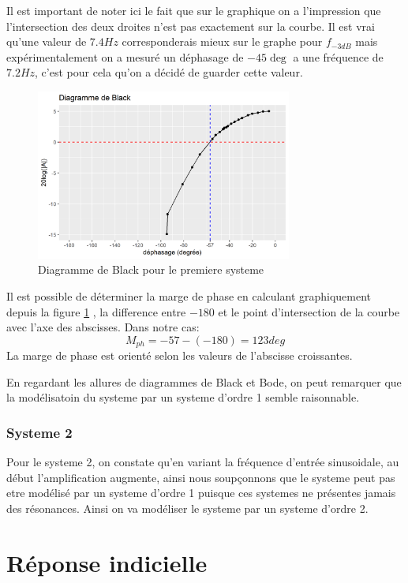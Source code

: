 \documentclass[12pt, a4paper]{report}
\begin{document}
Il est important de noter ici le fait que sur le graphique on a l'impression que
l'intersection des deux droites n'est pas exactement sur la courbe. Il est vrai 
qu'une valeur de $7.4 Hz$ corresponderais mieux sur le graphe pour $f_{-3dB}$ mais 
expérimentalement on a mesuré un déphasage de $-45 \deg$ a une fréquence de $7.2 Hz$, c'est pour 
cela qu'on a décidé de guarder cette valeur.

\begin{figure}[H]
    \centering
    \includegraphics[width=0.75\textwidth]{black1.png}
    \caption{Diagramme de Black pour le premiere systeme}
    \label{fig:diagBlack1}
\end{figure}

Il est possible de déterminer la marge de phase en calculant graphiquement depuis la figure \ref{fig:diagBlack1}
, la difference entre 
$-180$ et le point d'intersection de la courbe avec l'axe des abscisses. Dans notre cas:
\[
    M_{ph} = -57 - (-180) = 123 deg
    \]
La marge de phase est orienté selon les valeurs de l'abscisse croissantes.\par 

En regardant les allures de diagrammes de Black et Bode, on peut remarquer que la modélisatoin du systeme par un systeme d'ordre
1 semble raisonnable.


\subsubsection{Systeme 2}

Pour le systeme 2, on constate qu'en variant la fréquence d'entrée sinusoidale, au début l'amplification augmente, ainsi
nous soupçonnons que le systeme peut pas etre modélisé par un systeme d'ordre 1 puisque ces systemes
ne présentes jamais des résonances. Ainsi on va modéliser le systeme par un systeme d'ordre 2.

\section{Réponse indicielle}
\end{document}
